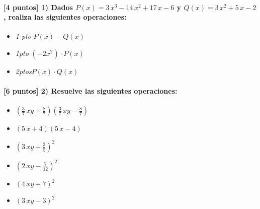 \paragraph{[4 puntos] 1) Dados $P(x) = 3 \, x^{3} - 14 \, x^{2} + 17 \, x - 6 $ y $Q(x) = 3 \, x^{2} + 5 \, x - 2 $, realiza las siguientes operaciones:} \begin{itemize}\item\textit{1 pto}\;\; $P(x) - Q(x)$\item \textit{1pto}\;\; $\left(-2x^2\right) \cdot P(x)$\item\textit{2ptos}\;\;$P(x)\cdot Q(x)$  \end{itemize} \paragraph{[6 puntos] 2) Resuelve las siguientes operaciones:} \begin{itemize} \item $ \left( \frac{3}{7} \, x y + \frac{8}{7} \right) \left( \frac{3}{7} \, x y - \frac{8}{7} \right) $ \item $ \left( 5 \, x + 4 \right) \left( 5 \, x - 4 \right) $ \item $ \left( 3 \, x y + \frac{3}{5} \right)^2 $ \item $ \left( 2 \, x y - \frac{7}{12} \right)^2 $ \item $ \left( 4 \, x y + 7 \right)^2 $ \item $ \left( 3 \, x y - 3 \right)^2 $ \end{itemize}
